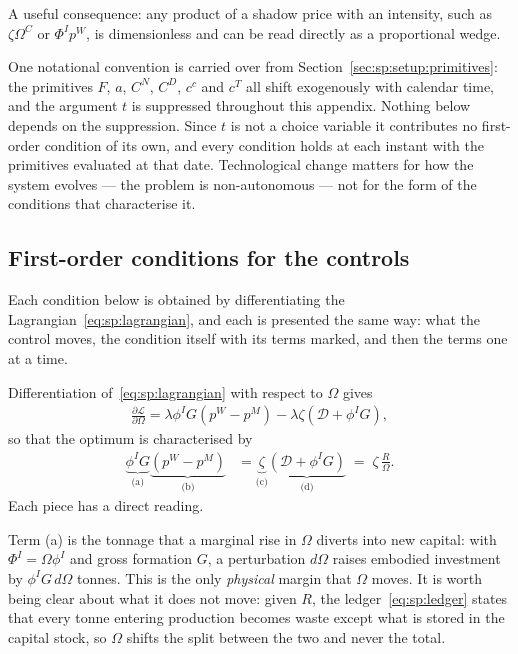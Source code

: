A useful consequence: any product of a shadow price with an intensity, such as $\zeta\Omega^C$ or $\Phi^Ip^W$, is dimensionless and can be read directly as a proportional wedge.

One notational convention is carried over from Section~\ref{sec:sp:setup:primitives}: the primitives $F$, $a$, $C^N$, $C^D$, $c^c$ and $c^T$ all shift exogenously with calendar time, and the argument $t$ is suppressed throughout this appendix. Nothing below depends on the suppression. Since $t$ is not a choice variable it contributes no first-order condition of its own, and every condition holds at each instant with the primitives evaluated at that date. Technological change matters for how the system evolves --- the problem is non-autonomous --- not for the form of the conditions that characterise it.

\subsection{First-order conditions for the controls}\label{sec:app:sp:foc}

Each condition below is obtained by differentiating the Lagrangian~\eqref{eq:sp:lagrangian}, and each is presented the same way: what the control moves, the condition itself with its terms marked, and then the terms one at a time.

Differentiation of~\eqref{eq:sp:lagrangian} with respect to $\Omega$ gives
\begin{align*}
    \frac{\partial \mathcal{L}}{\partial \Omega} = \lambda \phi^IG\left(p^W-p^M\right) - \lambda \zeta \left(\mathcal{D}+\phi^IG\right),
\end{align*}
so that the optimum is characterised by
\begin{align}
    \underbrace{\phi^IG}_{\text{(a)}}\underbrace{\left(p^W-p^M\right)}_{\text{(b)}}
    &= \underbrace{\zeta}_{\text{(c)}}\underbrace{\left(\mathcal D+\phi^IG\right)}_{\text{(d)}}
    \;=\;\zeta\,\frac{R}{\Omega}.
\label{eq:sp:foc:Omega}
\end{align}
Each piece has a direct reading.

Term (a) is the tonnage that a marginal rise in $\Omega$ diverts into new capital: with $\Phi^I=\Omega\phi^I$ and gross formation $G$, a perturbation $d\Omega$ raises embodied investment by $\phi^IG\,d\Omega$ tonnes. This is the only \emph{physical} margin that $\Omega$ moves. It is worth being clear about what it does not move: given $R$, the ledger~\eqref{eq:sp:ledger} states that every tonne entering production becomes waste except what is stored in the capital stock, so $\Omega$ shifts the split between the two and never the total.

